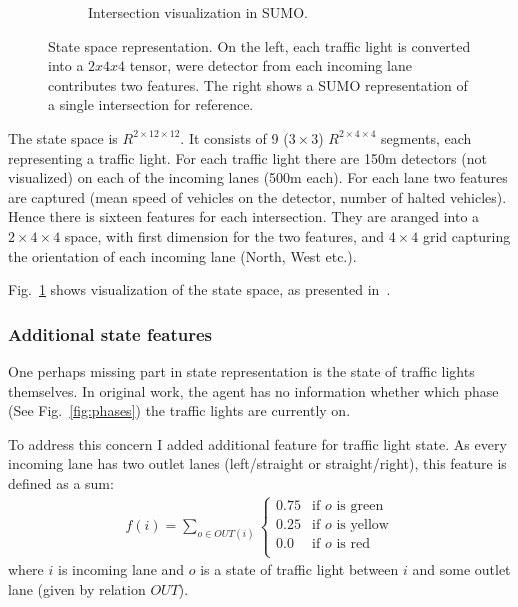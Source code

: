 \documentclass{article}
\begin{document}
\begin{figure}[h]
\begin{subfigure}[b]{0.3\linewidth}
            \caption{Intersection visualization in SUMO.}
        \end{subfigure}
        \caption{
            State space representation.
            On the left, each traffic light is converted into a $2x4x4$ tensor, were detector from each incoming lane contributes two features.
            The right shows a SUMO representation of a single intersection for reference.
        }
        \label{fig:state-space}
    \end{figure}

    The state space is $R^{2\times12\times12}$.
    It consists of 9 ($3\times3$) $R^{2\times4\times4}$ segments, each representing a traffic light.
    For each traffic light there are 150m detectors (not visualized) on each of the incoming lanes (500m each).
    For each lane two features are captured (mean speed of vehicles on the detector, number of halted vehicles).
    Hence there is sixteen features for each intersection.
    They are aranged into a $2\times4\times4$ space, with first dimension for the two features,
    and $4\times4$ grid capturing the orientation of each incoming lane (North, West etc.).

    Fig.~\ref{fig:state-space} shows visualization of the state space, as presented in~\cite{utc}.

    \subsubsection{Additional state features}
    \label{sec-sub:add-feats}
    One perhaps missing part in state representation is the state of traffic lights themselves.
    In original work, the agent has no information whether which phase (See Fig.~\ref{fig:phases}) the traffic lights are currently on.

    To address this concern I added additional feature for traffic light state.
    As every incoming lane has two outlet lanes (left/straight or straight/right), this feature is defined as a sum:
    \begin{align*}
        f(i) = \sum\limits_{o \in OUT(i)} \begin{cases}
            0.75 & \text{if $o$ is green} \\
            0.25 & \text{if $o$ is yellow} \\
            0.0 & \text{if $o$ is red} \\
        \end{cases}
    \end{align*}
    where $i$ is incoming lane and $o$ is a state of traffic light between $i$ and some outlet lane (given by relation $OUT$).
\end{document}
